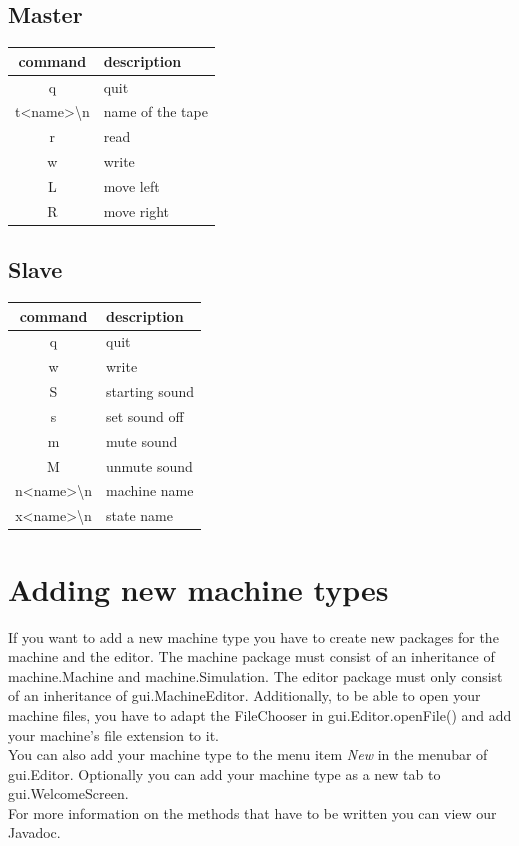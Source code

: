 \documentclass[%
  a4paper,%
  11pt,%
  blue,%
  hyperref	%
  ]{tubsartcl}
\begin{document}
\begin{minipage}{5cm}
\subsection{Master}
\begin{tabular}{c|l}
command & description\\
\hline
q & quit\\
t<name>\textbackslash n & name of the tape\\
r & read\\
w & write\\
L & move left\\
R & move right
\end{tabular}
\vspace{1cm}
\end{minipage}
\hspace{2cm}
\begin{minipage}{5cm}
\subsection{Slave}
\begin{tabular}{c|l}
command & description\\
\hline
q & quit\\
w & write\\
S & starting sound\\
s & set sound off\\
m & mute sound\\
M & unmute sound\\
n<name>\textbackslash n & machine name\\
x<name>\textbackslash n & state name
\end{tabular}
\end{minipage}

\section{Adding new machine types}

If you want to add a new machine type you have to create new packages for the machine and the editor. The machine package must consist of an inheritance of machine.Machine and machine.Simulation. The editor package must only consist of  an inheritance of gui.MachineEditor. Additionally, to be able to open your machine files, you have to adapt the FileChooser in gui.Editor.openFile() and add your machine's file extension to it. \\
You can also add your machine type to the menu item \textit{New} in the menubar of gui.Editor. Optionally you can add your machine type as a new tab to gui.WelcomeScreen.\\
For more information on the methods that have to be written you can view our Javadoc.

\makebackpage[trisec]%
\end{document}
